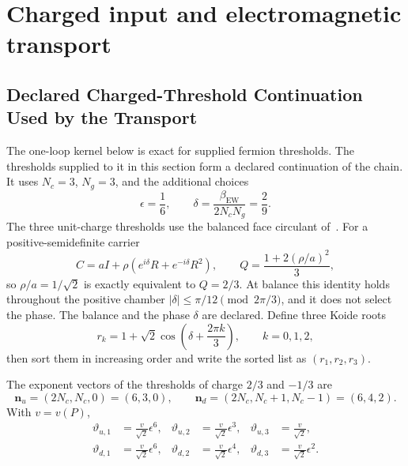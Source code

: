 \documentclass[11pt]{article}
\theoremstyle{remark}
\newcommand{\Nc}{N_c}
\newcommand{\Ng}{N_g}
\begin{document}
\section{Charged input and electromagnetic transport}
\subsection{Declared Charged-Threshold Continuation Used by the Transport}
\label{sec:alpha-step-13}

The one-loop kernel below is exact for supplied fermion thresholds. The
thresholds supplied to it in this section form a declared continuation of the
chain. It uses \(\Nc=3\), \(\Ng=3\), and the additional choices
\begin{equation}
\epsilon=\frac16,
\qquad
\delta=\frac{\beta_{\mathrm{EW}}}{2\Nc\Ng}
=\frac{2}{9}.
\label{eq:epsdelta}
\end{equation}
The three unit-charge thresholds use the balanced face circulant
of~\cite{oph-koide}. For a positive-semidefinite carrier
\[
C=aI+\rho(e^{i\delta}R+e^{-i\delta}R^2),
\qquad
Q=\frac{1+2(\rho/a)^2}{3},
\]
so \(\rho/a=1/\sqrt2\) is exactly equivalent to \(Q=2/3\). At balance this
identity holds throughout the positive chamber
\(|\delta|\leq\pi/12\pmod{2\pi/3}\), and it does not select the phase. The
balance and the phase \(\delta\) are declared.
Define three Koide roots
\begin{equation}
r_k=1+\sqrt2\cos\!\left(\delta+\frac{2\pi k}{3}\right),
\qquad k=0,1,2,
\label{eq:koide}
\end{equation}
then sort them in increasing order and write the sorted list as
\((r_1,r_2,r_3)\).

The exponent vectors of the thresholds of charge \(2/3\) and \(-1/3\) are
\begin{equation}
\bm n_u=(2\Nc,\Nc,0)=(6,3,0),
\qquad
\bm n_d=(2\Nc,\Nc+1,\Nc-1)=(6,4,2).
\label{eq:quarkexponents}
\end{equation}
With \(v=v(P)\),
\begin{align}
\vartheta_{u,1}&=\frac{v}{\sqrt2}\epsilon^6,
&
\vartheta_{u,2}&=\frac{v}{\sqrt2}\epsilon^3,
&
\vartheta_{u,3}&=\frac{v}{\sqrt2},\\
\vartheta_{d,1}&=\frac{v}{\sqrt2}\epsilon^6,
&
\vartheta_{d,2}&=\frac{v}{\sqrt2}\epsilon^4,
&
\vartheta_{d,3}&=\frac{v}{\sqrt2}\epsilon^2.
\label{eq:colourthresholds}
\end{align}
\end{document}
